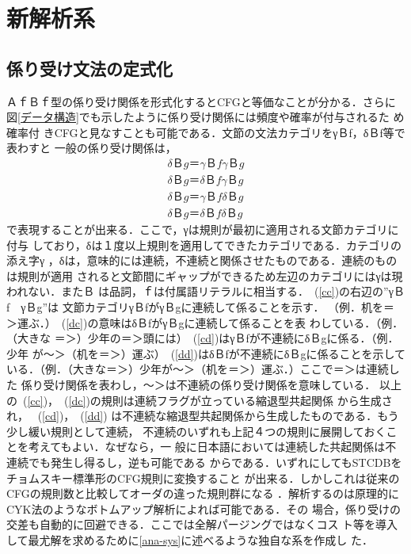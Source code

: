 \section{新解析系}
\label{new-ana}

\subsection{係り受け文法の定式化}

ＡｆＢｆ型の係り受け関係を形式化するとCFGと等価なことが分かる．さらに
図\ref{データ構造}でも示したように係り受け関係には頻度や確率が付与されるた
め確率付
きCFGと見なすことも可能である．文節の文法カテゴリをγＢf，δＢf等で表わすと
一般の係り受け関係は，
\begin{eqnarray}
δＢg　 ＝     γＢf　    γＢg
\label{cc}
\\
δＢg　 ＝     δＢf　    γＢg
\label{dc}
\\
δＢg　 ＝     γＢf　    δＢg
\label{cd}
\\
δＢg　 ＝     δＢf　    δＢg
\label{dd}
\end{eqnarray}
で表現することが出来る．ここで，γは規則が最初に適用される文節カテゴリに付与
しており，δは１度以上規則を適用してできたカテゴリである．カテゴリの添え字γ
，δは，意味的には連続，不連続と関係させたものである．連続のものは規則が適用
されると文節間にギャップができるため左辺のカテゴリにはγは現われない．またＢ
は品詞，ｆは付属語リテラルに相当する．~(\ref{cc})の右辺の”γＢf　γＢg”は
文節カテゴリγＢfがγＢgに連続して係ることを示す．
（例．机を＝＞運ぶ．）~(\ref{dc})の意味はδＢfがγＢgに連続して係ることを表
わしている．（例．（大きな
＝＞）少年の＝＞頭には）~(\ref{cd})はγＢfが不連続にδＢgに係る．（例．少年
が〜＞（机を＝＞）運ぶ）~(\ref{dd})はδＢfが不連続にδＢgに係ることを示して
いる．（例．（大きな＝＞）少年が〜＞（机を＝＞）運ぶ．）ここで＝＞は連続した
係り受け関係を表わし，〜＞は不連続の係り受け関係を意味している．
以上の~(\ref{cc})，~(\ref{dc})の規則は連続フラグが立っている縮退型共起関係
から生成され，
~(\ref{cd})，~(\ref{dd})
は不連続な縮退型共起関係から生成したものである．もう少し緩い規則として連続，
不連続のいずれも上記４つの規則に展開しておくことを考えてもよい．なぜなら，一
般に日本語においては連続した共起関係は不連続でも発生し得るし，逆も可能である
からである．いずれにしてもSTCDBをチョムスキー標準形のCFG規則に変換すること
が出来る．しかしこれは従来のCFGの規則数と比較してオーダの違った規則群になる
．解析するのは原理的にCYK法のようなボトムアップ解析によれば可能である．その
場合，係り受けの交差も自動的に回避できる．ここでは全解パージングではなくコス
ト等を導入して最尤解を求めるために\ref{ana-sys}に述べるような独自な系を作成し
た．

